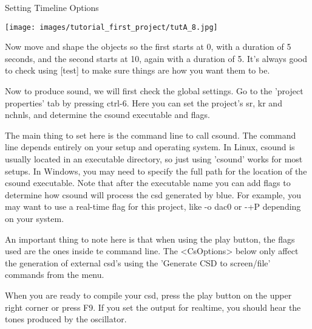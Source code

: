 Setting Timeline Options

\texttt{[image: images/tutorial\_first\_project/tutA\_8.jpg]}

Now move and shape the objects so the first starts at 0, with a duration
of 5 seconds, and the second starts at 10, again with a duration of 5.
It's always good to check using {[}test{]} to make sure things are how
you want them to be.

Now to produce sound, we will first check the global settings. Go to the
'project properties' tab by pressing ctrl-6. Here you can set the
project's sr, kr and nchnls, and determine the csound executable and
flags.

The main thing to set here is the command line to call csound. The
command line depends entirely on your setup and operating system. In
Linux, csound is usually located in an executable directory, so just
using 'csound' works for most setups. In Windows, you may need to
specify the full path for the location of the csound executable. Note
that after the executable name you can add flags to determine how csound
will process the csd generated by blue. For example, you may want to use
a real-time flag for this project, like -o dac0 or -+P depending on your
system.

An important thing to note here is that when using the play button, the
flags used are the ones inside te command line. The
\textless{}CsOptions\textgreater{} below only affect the generation of
external csd's using the 'Generate CSD to screen/file' commands from the
menu.

When you are ready to compile your csd, press the play button on the
upper right corner or press F9. If you set the output for realtime, you
should hear the tones produced by the oscillator.

